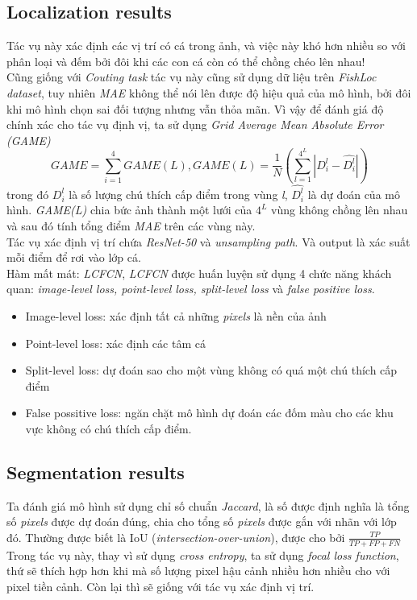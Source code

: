 \documentclass{article}
\begin{document}
        \subsection{Localization results}
        Tác vụ này xác định các vị trí có cá trong ảnh, và việc này khó hơn nhiều so với phân loại và đếm bởi đôi khi các con cá còn có thể chồng chéo lên nhau!\\
        Cũng giống với \textit{Couting task} tác vụ này cũng sử dụng dữ liệu trên \textit{FishLoc dataset}, tuy nhiên \textit{MAE} không thể nói lên được độ hiệu quả của mô hình, bởi đôi khi mô hình chọn sai đối tượng nhưng vẫn thỏa mãn. Vì vậy để đánh giá độ chính xác cho tác vụ định vị, ta sử dụng \textit{Grid Average Mean Absolute Error (GAME)}
        $$ GAME = \sum_{i=1}^{4} GAME(L), GAME(L) = \frac{1}{N} \left( \sum_{l=1}^{4^L}|D_{i}^{l} - \hat{D_{i}^{l}}| \right)$$
        trong đó $D_{i}^{l}$ là số lượng chú thích cấp điểm trong vùng \textit{l}, $\hat{D_{i}^{l}}$ là dự đoán của mô hình. \textit{GAME(L)} chia bức ảnh thành một lưới của $4^L$ vùng không chồng lên nhau và sau đó tính tổng điểm \textit{MAE} trên các vùng này.\\
        Tác vụ xác định vị trí chứa \textit{ResNet-50} và \textit{unsampling path}. Và output là xác suất mỗi điểm để rơi vào lớp cá.\\
        Hàm mất mát: \textit{LCFCN}, \textit{LCFCN} được huấn luyện sử dụng 4 chức năng khách quan: \textit{image-level loss, point-level loss, split-level loss} và \textit{false positive loss}. 
        \begin{itemize}
            \item Image-level loss: xác định tất cả những \textit{pixels} là nền của ảnh
            \item Point-level loss: xác định các tâm cá
            \item Split-level loss: dự đoán sao cho một vùng không có quá một chú thích cấp điểm
            \item False possitive loss: ngăn chặt mô hình dự đoán các đốm màu cho các khu vực không có chú thích cấp điểm.
        \end{itemize}

        \subsection{Segmentation results}
        Ta đánh giá mô hình sử dụng chỉ số chuẩn \textit{Jaccard}, là số được định nghĩa là tổng số \textit{pixels} được dự đoán đúng, chia cho tổng số \textit{pixels} được gắn với nhãn với lớp đó. Thường được biết là IoU (\textit{intersection-over-union}), được cho bởi $\frac{TP}{TP+FP+FN}$ \\
        Trong tác vụ này, thay vì sử dụng \textit{cross entropy}, ta sử dụng \textit{focal loss function}, thứ sẽ thích hợp hơn khi mà số lượng pixel hậu cảnh nhiều hơn nhiều cho với pixel tiền cảnh. Còn lại thì sẽ giống với tác vụ xác định vị trí.
\end{document}
